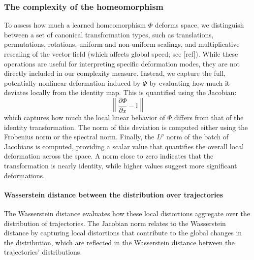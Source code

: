 \documentclass{article}
\theoremstyle{definition} \newtheorem{definition}{Definition}  \newtheorem{example}{Example}
\theoremstyle{remark} \newtheorem{remark}{Remark}
\newcounter{ct}
\begin{document}
\subsubsection{The complexity of the homeomorphism}
To assess how much a learned homeomorphism $\Phi$ deforms space, we distinguish between a set of canonical transformation types, such as translations, permutations, rotations, uniform and non-uniform scalings, and multiplicative rescaling of the vector field (which affects global speed; see [ref]).
 While these operations are useful for interpreting specific deformation modes, they are not directly included in our complexity measure.
Instead, we capture the full, potentially nonlinear deformation induced by $\Phi$ by evaluating how much it deviates locally from the identity map. This is quantified using the Jacobian:
\[
\left\|\frac{\partial \Phi}{\partial x} - \mathbb{I}\right\|
\]
which captures how much the local linear behavior of $\Phi$ differs from that of the identity transformation.
The norm of this deviation is computed either using the Frobenius norm or the spectral norm.
Finally, the \( L^p \) norm of the batch of Jacobians is computed, providing a scalar value that quantifies the overall local deformation across the space. A norm close to zero indicates that the transformation is nearly identity, while higher values suggest more significant deformations.


\paragraph{Wasserstein distance between the distribution over trajectories}
\citep{bion2019wasserstein}

The Wasserstein distance evaluates how these local distortions aggregate over the distribution of trajectories.
The Jacobian norm relates to the Wasserstein distance by capturing local distortions that contribute to the global changes in the distribution, which are reflected in the Wasserstein distance between the trajectories' distributions.
\end{document}
